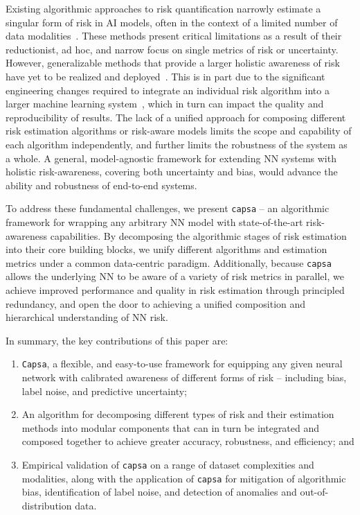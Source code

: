 \documentclass{article} %
\def\capsa{\texttt{{capsa}}}
\def\Capsa{\texttt{{Capsa}}}
\begin{document}
Existing algorithmic approaches to risk quantification narrowly estimate a singular form of risk in AI models, often in the context of a limited number of data modalities~\citep{nix1994estimating, kendall2017uncertainties, lakshminarayanan2017simple,buolamwini2018gender, zhang2018mitigating, gilitschenski2019deep}. These methods present critical limitations as a result of their reductionist, ad hoc, and narrow focus on single metrics of risk or uncertainty. However, generalizable methods that provide a larger holistic awareness of risk have yet to be realized and deployed~\citep{nado2021uncertainty, tran2022plex}. This is in part due to the significant engineering changes required to integrate an individual risk algorithm into a larger machine learning system~\citep{tran2016edward, dillon2017tensorflow, bingham2019pyro, shi2017zhusuan}, which in turn can impact the quality and reproducibility of results. The lack of a unified approach for composing different risk estimation algorithms or risk-aware models limits the scope and capability of each algorithm independently, and further limits the robustness of the system as a whole. A general, model-agnostic framework for extending NN systems with holistic risk-awareness, covering both uncertainty and bias, would advance the ability and robustness of end-to-end systems.

To address these fundamental challenges, we present \capsa{} -- an algorithmic framework for wrapping any arbitrary NN model with state-of-the-art risk-awareness capabilities. By decomposing the algorithmic stages of risk estimation into their core building blocks, we unify different algorithms and estimation metrics under a common data-centric paradigm. Additionally, because \capsa{} allows the underlying NN to be aware of a variety of risk metrics in parallel, we achieve improved performance and quality in risk estimation through principled redundancy, and open the door to achieving a unified composition and hierarchical understanding of NN risk.

In summary, the key contributions of this paper are:
\begin{enumerate}
    \item \Capsa{}, a flexible, and easy-to-use framework for equipping any given neural network with calibrated awareness of different forms of risk -- including bias, label noise, and predictive uncertainty;  
    \item An algorithm for decomposing different types of risk and their estimation methods into modular components that can in turn be integrated and composed together to achieve greater accuracy, robustness, and efficiency; and
    \item Empirical validation of \capsa{} on a range of dataset complexities and modalities, along with the application of \capsa{} for mitigation of algorithmic bias, identification of label noise, and detection of anomalies and out-of-distribution data.
\end{enumerate}
\end{document}
